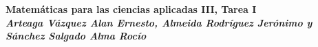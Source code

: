 \documentclass[a4paper,12pt]{article}
\begin{document}
\newcommand{\osf}[2]{\dfrac{#1^2}{#2^2}}
\newcommand{\T}{\Big(2\pi\cdot\sqrt{\dfrac{l}{g}}\Big)}
\newcommand{\alpa}{\dfrac{e^{x \beta -3}{2y\beta +5}}}
\newcommand{\deriv}[2]{\dfrac{\delta #1}{\delta #2}}
\newcommand{\ext}{e^{ax-bt}}
\newcommand{\exy}{e^{((x-1)^2 + (y-3)^2}}
\begin{center}
	\textbf{Matemáticas para las ciencias aplicadas III, Tarea I}\\
	\textbf{\textit{Arteaga Vázquez Alan Ernesto, Almeida Rodríguez Jerónimo y Sánchez Salgado Alma Rocío}}
\end{center}
\end{document}
